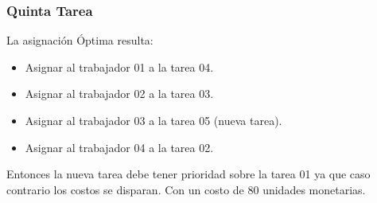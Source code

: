 \begin{homeworkProblem}[-1][JoShop]
\subsubsection{Quinta Tarea}
La asignación Óptima resulta:
\begin{itemize}
    \item Asignar al trabajador 01 a la tarea 04.
    \item Asignar al trabajador 02 a la tarea 03.
    \item Asignar al trabajador 03 a la tarea 05 (nueva tarea).
    \item Asignar al trabajador 04 a la tarea 02.
\end{itemize}
Entonces la nueva tarea debe tener prioridad sobre la tarea 01 ya que caso contrario los costos se disparan. Con un costo de 80 unidades monetarias.
\end{homeworkProblem}


